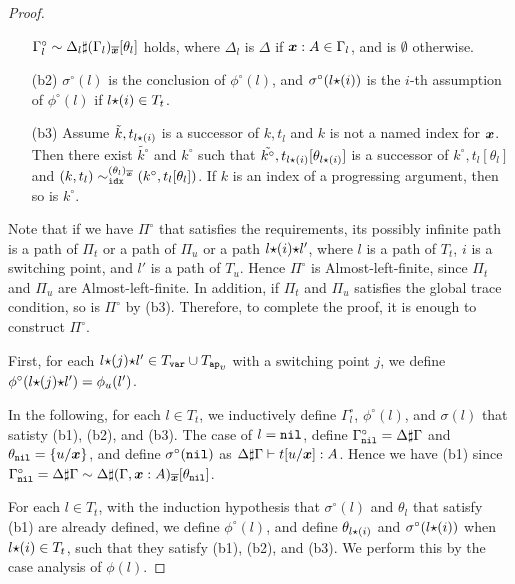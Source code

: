 \begin{proof}
\begin{itemize}
    $\Gamma^\circ_l \sim \Delta_l\sharp(\Gamma_l)_{\overline{\boldsymbol{x}}}[\theta_l]$ holds,
    where $\Delta_l$ is $\Delta$ if $\boldsymbol{x}:A\in\Gamma_l$, and is $\emptyset$ otherwise. 
  \item[(b2)]
    $\sigma^\circ(l)$ is the conclusion of $\phi^\circ(l)$,
    and $\sigma^\circ(l{\star}(i))$ is the $i$-th assumption of $\phi^\circ(l)$ if $l{\star}(i) \in T_t$.
  \item[(b3)]
    Assume $\tilde{k},t_{l{\star}(i)}$ is a successor of $k,t_l$ and $k$ is not a named index for $\boldsymbol{x}$. 
    Then there exist $\tilde{k^\circ}$ and $k^\circ$ such that
    $\tilde{k^\circ},t_{l{\star}(i)}[\theta_{l{\star}(i)}]$ is a successor of $k^\circ,t_l[\theta_l]$ and 
    $(k,t_l) \sim^{(\theta_l)_{\overline{\boldsymbol{x}}}}_{{\tt idx}} (k^\circ,t_l[\theta_l])$.
    If $k$ is an index of a progressing argument, then so is $k^\circ$.    
  \end{itemize}
  
  Note that if we have $\Pi^\circ$ that satisfies the requirements, its possibly infinite path
  is a path of $\Pi_t$ or a path of $\Pi_u$ or a path $l{\star}(i){\star} l'$,
  where $l$ is a path of $T_t$, $i$ is a switching point, and $l'$ is a path of $T_u$.
  Hence $\Pi^\circ$ is Almost-left-finite, since $\Pi_t$ and $\Pi_u$ are Almost-left-finite.
  In addition, if $\Pi_t$ and $\Pi_u$ satisfies the global trace condition,
  so is $\Pi^\circ$ by (b3). 
  Therefore, to complete the proof, it is enough to construct $\Pi^\circ$. 

  First, for each $l\conc(j)\conc l'\in T_\var\cup T_\apvar$ with a switching point $j$, 
  we define $\phi^\circ(l{\star}(j){\star} l') = \phi_u(l')$. 

  In the following, for each $l\in T_t$, we inductively define $\Gamma^\circ_l$, $\phi^\circ(l)$, and $\sigma(l)$
  that satisty (b1), (b2), and (b3).
  The case of $l={\tt nil}$, define $\Gamma^\circ_{\tt nil} = \Delta\sharp\Gamma$ and $\theta_{\tt nil}=\{u/\boldsymbol{x}\}$,
  and define $\sigma^\circ({\tt nil})$ as $\Delta\sharp\Gamma\vdash t[u/\boldsymbol{x}]:A$. 
  Hence we have (b1) since
  $\Gamma^\circ_{\tt nil} = \Delta\sharp\Gamma \sim \Delta\sharp(\Gamma,\boldsymbol{x}:A)_{\overline{\boldsymbol{x}}}[\theta_{\tt nil}]$. 

  For each $l\in T_t$,
  with the induction hypothesis that $\sigma^\circ(l)$ and $\theta_l$ that satisfy (b1) are already defined, 
  we define $\phi^\circ(l)$, and define $\theta_{l{\star}(i)}$ and $\sigma^\circ(l{\star}(i))$ when $l{\star}(i)\in T_t$, 
  such that they satisfy (b1), (b2), and (b3). 
  We perform this by the case analysis of $\phi(l)$.


\end{proof}
